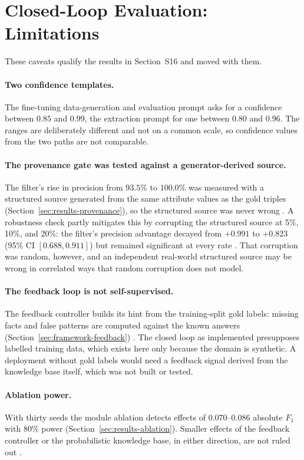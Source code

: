 \documentclass[11pt]{article}
\begin{document}
\section{Closed-Loop Evaluation: Limitations}
\label{sec:s18}

These caveats qualify the results in Section~S16 and moved with them.

\paragraph{Two confidence templates.} The fine-tuning data-generation and
evaluation prompt asks for a confidence between $0.85$ and $0.99$, the
extraction prompt for one between $0.80$ and $0.96$. The ranges are
deliberately different and not on a common scale, so confidence values
from the two paths are not comparable.

\paragraph{The provenance gate was tested against a generator-derived
source.} The filter's rise in precision from $93.5\%$ to $100.0\%$ was
measured with a structured source generated from the same attribute
values as the gold triples (Section~\ref{sec:results-provenance}), so
the structured source was never wrong
. A robustness check partly mitigates this by corrupting the structured
source at 5\%, 10\%, and 20\%: the filter's precision advantage decayed from
$+0.991$ to $+0.823$ (95\% CI $[0.688, 0.911]$) but remained
significant at every rate
. That corruption was random, however, and
an independent real-world structured source may be wrong in correlated
ways that random corruption does not model.

\paragraph{The feedback loop is not self-supervised.} The feedback
controller builds its hint from the training-split gold labels: missing
facts and false patterns are computed against the known answers
(Section~\ref{sec:framework-feedback})
. The closed loop as implemented presupposes labelled training data,
which exists here only because the domain is synthetic. A deployment
without gold labels would need a feedback signal derived from the
knowledge base itself, which was not built or tested.

\paragraph{Ablation power.} With thirty seeds the module ablation
detects effects of $0.070$--$0.086$ absolute $F_1$ with 80\% power
(Section~\ref{sec:results-ablation}). Smaller effects of the feedback
controller or the probabilistic knowledge base, in either direction,
are not ruled out
.
\end{document}
